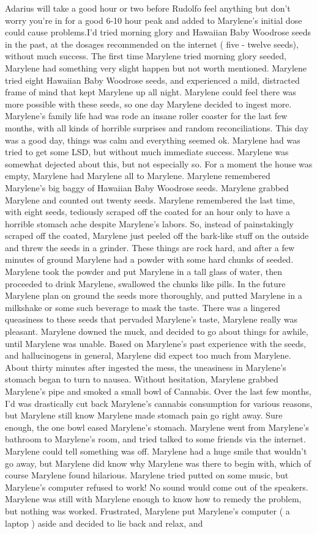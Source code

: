 \documentclass[12pt]{book}
\begin{document}
Adarius will take a good hour or two before Rudolfo feel anything but don't worry you're in for a good 6-10 hour peak and added to Marylene's initial dose could cause problems.I'd tried morning glory and Hawaiian Baby Woodrose seeds in the past, at the dosages recommended on the internet ( five - twelve seeds), without much success. The first time Marylene tried morning glory seeded, Marylene had something very slight happen but not worth mentioned. Marylene tried eight Hawaiian Baby Woodrose seeds, and experienced a mild, distracted frame of mind that kept Marylene up all night. Marylene could feel there was more possible with these seeds, so one day Marylene decided to ingest more. Marylene's family life had was rode an insane roller coaster for the last few months, with all kinds of horrible surprises and random reconciliations. This day was a good day, things was calm and everything seemed ok. Marylene had was tried to get some LSD, but without much immediate success. Marylene was somewhat dejected about this, but not especially so. For a moment the house was empty, Marylene had Marylene all to Marylene. Marylene remembered Marylene's big baggy of Hawaiian Baby Woodrose seeds. Marylene grabbed Marylene and counted out twenty seeds. Marylene remembered the last time, with eight seeds, tediously scraped off the coated for an hour only to have a horrible stomach ache despite Marylene's labors. So, instead of painstakingly scraped off the coated, Marylene just peeled off the bark-like stuff on the outside and threw the seeds in a grinder. These things are rock hard, and after a few minutes of ground Marylene had a powder with some hard chunks of seeded. Marylene took the powder and put Marylene in a tall glass of water, then proceeded to drink Marylene, swallowed the chunks like pills. In the future Marylene plan on ground the seeds more thoroughly, and putted Marylene in a milkshake or some such beverage to mask the taste. There was a lingered queasiness to these seeds that pervaded Marylene's taste, Marylene really was pleasant. Marylene downed the muck, and decided to go about things for awhile, until Marylene was unable. Based on Marylene's past experience with the seeds, and hallucinogens in general, Marylene did expect too much from Marylene. About thirty minutes after ingested the mess, the uneasiness in Marylene's stomach began to turn to nausea. Without hesitation, Marylene grabbed Marylene's pipe and smoked a small bowl of Cannabis. Over the last few months, I'd was drastically cut back Marylene's cannabis consumption for various reasons, but Marylene still know Marylene made stomach pain go right away. Sure enough, the one bowl eased Marylene's stomach. Marylene went from Marylene's bathroom to Marylene's room, and tried talked to some friends via the internet. Marylene could tell something was off. Marylene had a huge smile that wouldn't go away, but Marylene did know why Marylene was there to begin with, which of course Marylene found hilarious. Marylene tried putted on some music, but Marylene's computer refused to work! No sound would come out of the speakers. Marylene was still with Marylene enough to know how to remedy the problem, but nothing was worked. Frustrated, Marylene put Marylene's computer ( a laptop ) aside and decided to lie back and relax, and 
\end{document}

